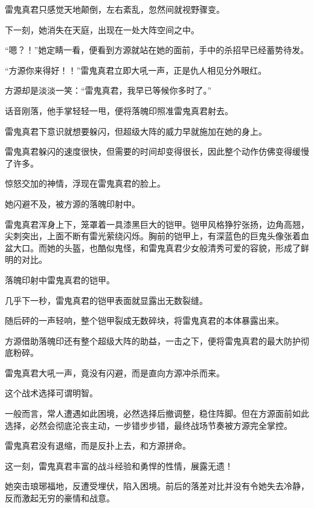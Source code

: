 
\begin{this_body}



雷鬼真君只感觉天地颠倒，左右紊乱，忽然间就视野骤变。

下一刻，她消失在天庭，出现在一处大阵空间之中。

“嗯？！”她定睛一看，便看到方源就站在她的面前，手中的杀招早已经蓄势待发。

“方源你来得好！！”雷鬼真君立即大吼一声，正是仇人相见分外眼红。

方源却是淡淡一笑：“雷鬼真君，我早已等候你多时了。”

话音刚落，他手掌轻轻一甩，便将落魄印照准雷鬼真君射去。

雷鬼真君下意识就想要躲闪，但超级大阵的威力早就施加在她的身上。

雷鬼真君躲闪的速度很快，但需要的时间却变得很长，因此整个动作仿佛变得缓慢了许多。

惊怒交加的神情，浮现在雷鬼真君的脸上。

她闪避不及，被方源的落魄印射中。

雷鬼真君浑身上下，笼罩着一具漆黑巨大的铠甲。铠甲风格狰狞张扬，边角高翘，尖刺突出，上面不断有雷光萦绕闪烁。胸前的铠甲上，有深蓝色的巨鬼头像张着血盆大口。而她的头盔，也酷似鬼怪，和雷鬼真君少女般清秀可爱的容貌，形成了鲜明的对比。

落魄印射中雷鬼真君的铠甲。

几乎下一秒，雷鬼真君的铠甲表面就显露出无数裂缝。

随后砰的一声轻响，整个铠甲裂成无数碎块，将雷鬼真君的本体暴露出来。

方源借助落魄印还有整个超级大阵的助益，一击之下，便将雷鬼真君的最大防护彻底粉碎。

雷鬼真君大吼一声，竟没有闪避，而是直向方源冲杀而来。

这个战术选择可谓明智。

一般而言，常人遭遇如此困境，必然选择后撤调整，稳住阵脚。但在方源面前如此选择，必然会彻底沦丧主动，一步错步步错，最终战场节奏被方源完全掌控。

雷鬼真君没有退缩，而是反扑上去，和方源拼命。

这一刻，雷鬼真君丰富的战斗经验和勇悍的性情，展露无遗！

她突击琅琊福地，反遭受埋伏，陷入困境。前后的落差对比并没有令她失去冷静，反而激起无穷的豪情和战意。


\end{this_body}
